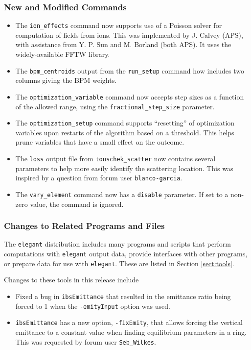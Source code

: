\documentclass[11pt]{article}
\begin{document}
\subsubsection{New and Modified Commands}
\begin{itemize}
\item The \verb|ion_effects| command now supports use of a Poisson solver for computation of fields from ions.
  This was implemented by J. Calvey (APS), with assistance from Y. P. Sun and M. Borland (both APS). It uses 
  the widely-available FFTW library.
\item The \verb|bpm_centroids| output from the \verb|run_setup| command how includes two columns giving the BPM weights.
\item The \verb|optimization_variable| command now accepts step sizes as a function of the allowed range, using the
  \verb|fractional_step_size| parameter.
\item The \verb|optimization_setup| command supports ``resetting'' of optimization variables upon restarts of the
  algorithm based on a threshold. This helps prune variables that have a small effect on the outcome.
\item The \verb|loss| output file from \verb|touschek_scatter| now contains several parameters to help more easily identify
  the scattering location. This was inspired by a question from forum user \verb|blanco-garcia|.
\item The \verb|vary_element| command now has a \verb|disable| parameter. If set to a non-zero value, the command is ignored.
\end{itemize}

\subsubsection{Changes to Related Programs and Files}

The {\tt elegant} distribution includes many programs and scripts that perform computations with {\tt elegant}
output data, provide interfaces with other programs, or prepare data for use with {\tt elegant}. These
are listed in Section \ref{sect:tools}. 

Changes to these tools in this release include
\begin{itemize}
\item Fixed a bug in \verb|ibsEmittance| that resulted in the emittance ratio being forced to 1 when the 
  \verb|-emityInput| option was used. 
\item \verb|ibsEmittance| has a new option, \verb|-fixEmity|, that allows forcing the vertical emittance
  to a constant value when finding equilibrium parameters in a ring.  This was requested by forum user
  \verb|Seb_Wilkes|.
\end{itemize}
\end{document}
